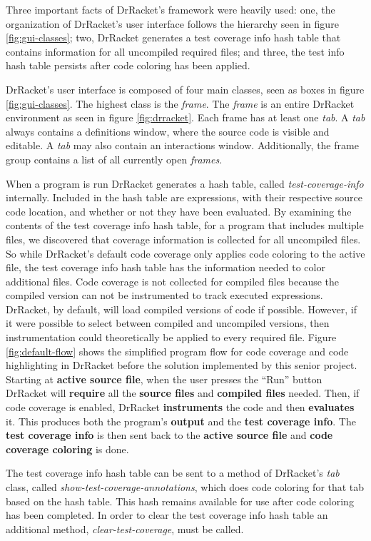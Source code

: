 
Three important facts of DrRacket's framework were heavily used: one, the organization of DrRacket's user interface follows the hierarchy seen in figure \ref{fig:gui-classes}; two, DrRacket generates a test coverage info hash table that contains information for all uncompiled required files; and three, the test info hash table persists after code coloring has been applied.

DrRacket's user interface is composed of four main classes, seen as boxes in figure \ref{fig:gui-classes}. The highest class is the \emph{frame}. The \emph{frame} is an entire DrRacket environment as seen in figure \ref{fig:drracket}. Each frame has at least one \emph{tab}. A \emph{tab} always contains a definitions window, where the source code is visible and editable. A \emph{tab} may also contain an interactions window. Additionally, the frame group contains a list of all currently open \emph{frames}.


When a program is run DrRacket generates a hash table, called \emph{test-coverage-info} internally. Included in the hash table are expressions, with their respective source code location, and whether or not they have been evaluated. By examining the contents of the test coverage info hash table, for a program that includes multiple files, we discovered that coverage information is collected for all uncompiled files. So while DrRacket's default code coverage only applies code coloring to the active file, the test coverage info hash table has the information needed to color additional files. Code coverage is not collected for compiled files because the compiled version can not be instrumented to track executed expressions. DrRacket, by default, will load compiled versions of code if possible. However, if it were possible to select between compiled and uncompiled versions, then instrumentation could theoretically be applied to every required file. Figure \ref{fig:default-flow} shows the simplified program flow for code coverage and code highlighting in DrRacket before the solution implemented by this senior project. Starting at \textbf{active source file}, when the user presses the ``Run'' button DrRacket will \textbf{require} all the \textbf{source files} and \textbf{compiled files} needed. Then, if code coverage is enabled, DrRacket \textbf{instruments} the code and then \textbf{evaluates} it. This produces both the program's \textbf{output} and the \textbf{test coverage info}. The \textbf{test coverage info} is then sent back to the \textbf{active source file} and \textbf{code coverage coloring} is done.


The test coverage info hash table can be sent to a method of DrRacket's \emph{tab} class, called \emph{show-test-coverage-annotations}, which does code coloring for that tab based on the hash table. This hash remains available for use after code coloring has been completed. In order to clear the test coverage info hash table an additional method, \emph{clear-test-coverage}, must be called. 

